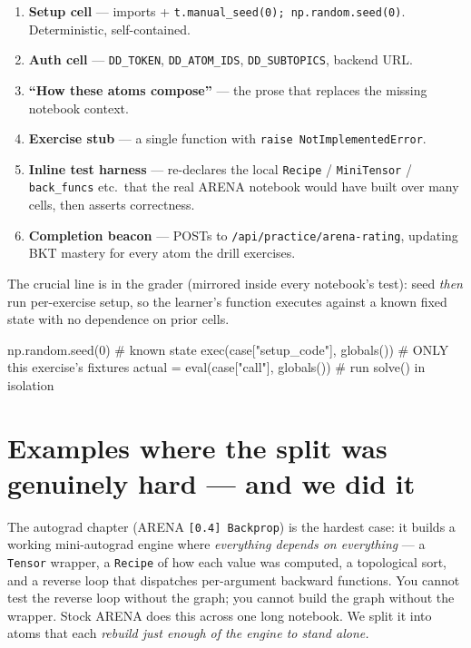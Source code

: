 \documentclass[11pt]{article}
\begin{document}
\begin{enumerate}[leftmargin=1.4em]
  \item \textbf{Setup cell} --- imports + \verb|t.manual_seed(0); np.random.seed(0)|. Deterministic, self-contained.
  \item \textbf{Auth cell} --- \verb|DD_TOKEN|, \verb|DD_ATOM_IDS|, \verb|DD_SUBTOPICS|, backend URL.
  \item \textbf{``How these atoms compose''} --- the prose that replaces the missing notebook context.
  \item \textbf{Exercise stub} --- a single function with \verb|raise NotImplementedError|.
  \item \textbf{Inline test harness} --- re-declares the local \verb|Recipe| / \verb|MiniTensor| /
        \verb|back_funcs| etc.\ that the real ARENA notebook would have built over many cells, then asserts correctness.
  \item \textbf{Completion beacon} --- POSTs to \verb|/api/practice/arena-rating|, updating BKT mastery for every atom the drill exercises.
\end{enumerate}

The crucial line is in the grader (mirrored inside every notebook's test): seed \emph{then}
run per-exercise setup, so the learner's function executes against a known fixed state with
no dependence on prior cells.

\begin{code}
np.random.seed(0)                       # known state
exec(case["setup_code"], globals())     # ONLY this exercise's fixtures
actual = eval(case["call"], globals())  # run solve() in isolation
\end{code}

\section{Examples where the split was genuinely hard --- and we did it}

The autograd chapter (ARENA \texttt{[0.4] Backprop}) is the hardest case: it builds a working
mini-autograd engine where \emph{everything depends on everything} --- a \texttt{Tensor}
wrapper, a \texttt{Recipe} of how each value was computed, a topological sort, and a reverse
loop that dispatches per-argument backward functions. You cannot test the reverse loop without
the graph; you cannot build the graph without the wrapper. Stock ARENA does this across one
long notebook. We split it into atoms that each \emph{rebuild just enough of the engine to
stand alone.}
\end{document}
